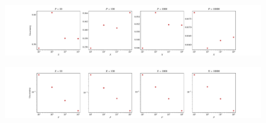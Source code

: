 \begin{figure}[htb]
    \centering
    \includegraphics[width=\linewidth]{figs/1.5_uncertainty_function_of_x.pdf}
    \caption{}
    \label{fig:uncertainty_function_of_x}
\end{figure}

\begin{figure}[htb]
    \centering
    \includegraphics[width=\linewidth]{figs/1.5_uncertainty_function_of_p.pdf}
    \caption{}
    \label{fig:uncertainty_function_of_p}
\end{figure}
